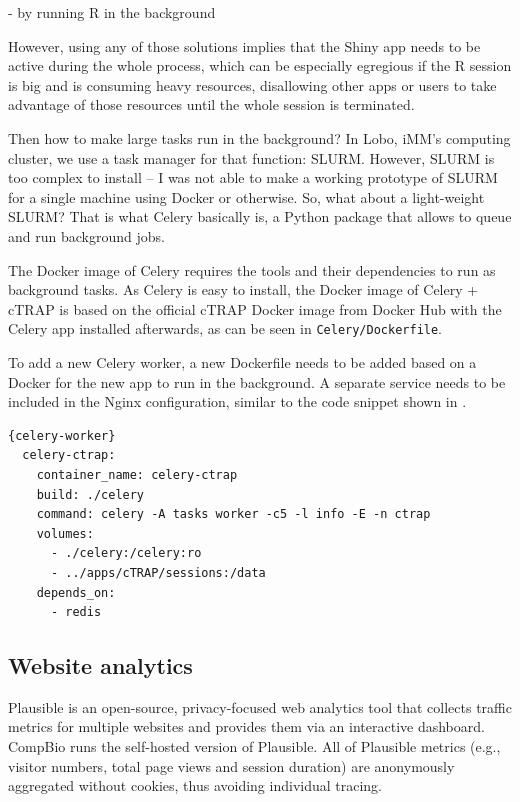 - by running R in the background

However, using any of those solutions implies that the Shiny app needs to be active during the whole process, which can be especially egregious if the R session is big and is consuming heavy resources, disallowing other apps or users to take advantage of those resources until the whole session is terminated.

Then how to make large tasks run in the background? In Lobo, iMM's computing cluster, we use a task manager for that function: SLURM. However, SLURM is too complex to install -- I was not able to make a working prototype of SLURM for a single machine using Docker or otherwise. So, what about a light-weight SLURM? That is what Celery basically is, a Python package that allows to queue and run background jobs.





The Docker image of Celery requires the tools and their dependencies to run as background tasks. As Celery is easy to install, the Docker image of Celery + cTRAP is based on the official cTRAP Docker image from Docker Hub with the Celery app installed afterwards, as can be seen in \texttt{Celery/Dockerfile}.

To add a new Celery worker, a new Dockerfile needs to be added based on a Docker for the new app to run in the background. A separate service needs to be included in the Nginx configuration, similar to the code snippet shown in .

\begin{lstlisting}[caption=Template for a new Celery worker.,language=XML,label={lst:celery-worker}]{celery-worker}
  celery-ctrap:
    container_name: celery-ctrap
    build: ./celery
    command: celery -A tasks worker -c5 -l info -E -n ctrap
    volumes:
      - ./celery:/celery:ro
      - ../apps/cTRAP/sessions:/data
    depends_on:
      - redis
\end{lstlisting}

\subsection{Website analytics}

Plausible is an open-source, privacy-focused web analytics tool that collects traffic metrics for multiple websites and provides them via an interactive dashboard. CompBio runs the self-hosted version of Plausible. All of Plausible metrics (e.g., visitor numbers, total page views and session duration) are anonymously aggregated without cookies, thus avoiding individual tracing.


